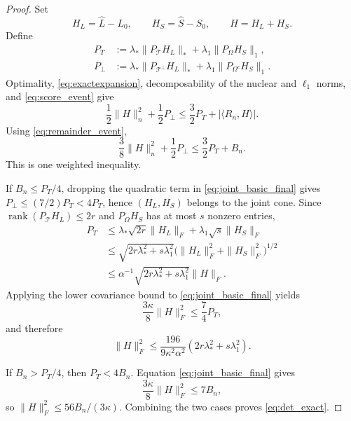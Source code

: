 \documentclass[10pt,a4paper]{amsart}
\DeclareMathOperator{\rank}{rank}
\begin{document}
	\begin{proof}
		Set
		\[H_L=\widehat L-L_0,\qquad H_S=\widehat S-S_0,\qquad H=H_L+H_S. \]
		Define
		\begin{align*}
			P_T&:=\lambda_*\|P_\mathcal T H_L\|_*+\lambda_1\|P_\Omega H_S\|_1,\\ P_\perp&:=\lambda_*\|P_{\mathcal T^\perp}H_L\|_*+\lambda_1\|P_{\Omega^c}H_S\|_1.
		\end{align*}
		Optimality, \eqref{eq:exactexpansion}, decomposability of the nuclear and $\ell_1$ norms, and \eqref{eq:score_event} give
		\[\frac12\|H\|_n^2+\frac12P_\perp \le\frac32P_T+|\langle R_n,H\rangle|.\]
		Using \eqref{eq:remainder_event},
		\begin{equation}
			\frac38\|H\|_n^2+\frac12P_\perp \le\frac32P_T+B_n. \label{eq:joint_basic_final}
		\end{equation}
		This is one weighted inequality.
		
		If $B_n\le P_T/4$, dropping the quadratic term in \eqref{eq:joint_basic_final} gives $P_\perp\le(7/2)P_T<4P_T$, hence $(H_L,H_S)$ belongs to the joint cone. Since $\rank(P_\mathcal T H_L)\le2r$ and $P_\Omega H_S$ has at most $s$ nonzero entries,
		\begin{align*}
			P_T&\le\lambda_*\sqrt{2r}\|H_L\|_F+\lambda_1\sqrt{s}\|H_S\|_F\\
			&\le\sqrt{2r\lambda_*^2+s\lambda_1^2} \bigl(\|H_L\|_F^2+\|H_S\|_F^2\bigr)^{1/2}\\
			&\le\alpha^{-1}\sqrt{2r\lambda_*^2+s\lambda_1^2}\|H\|_F.
		\end{align*}
		Applying the lower covariance bound to \eqref{eq:joint_basic_final} yields
		\[\frac{3\kappa}{8}\|H\|_F^2\le\frac74P_T,\]
		and therefore
		\[\|H\|_F^2\le\frac{196}{9\kappa^2\alpha^2} (2r\lambda_*^2+s\lambda_1^2).
		\]
		
		If $B_n>P_T/4$, then $P_T<4B_n$. Equation \eqref{eq:joint_basic_final} gives
		\[\frac{3\kappa}{8}\|H\|_F^2 \le7B_n,\]
		so $\|H\|_F^2\le56B_n/(3\kappa)$. Combining the two cases proves \eqref{eq:det_exact}.
	\end{proof}
\end{document}
